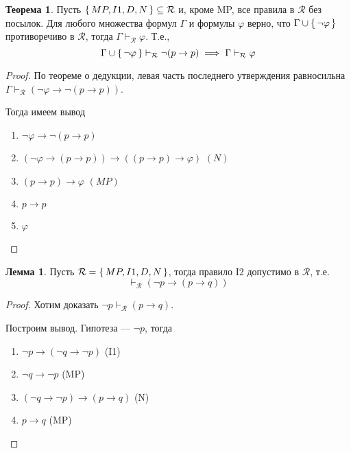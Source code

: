 \documentclass[12pt]{article}
\let\im\rightarrow
\let\n\neg
\let\un\cup
\let\sus\subseteq
\theoremstyle{definition}
\newtheorem{theorem}{Теорема}[section]
\theoremstyle{statement}
\theoremstyle{theorem}
\newtheorem{lemma}{Лемма}[section]
\begin{document}
\begin{theorem}
  Пусть $\set{MP, I1, D, N} \sus \mathcal{R}$ и, кроме MP, все
  правила в $\mathcal{R}$ без посылок. Для любого множества формул
  $\Gamma$ и формулы $\varphi$ верно, что $\Gamma \un \set{\n
  \varphi}$ противоречиво в $\mathcal{R}$, тогда $\Gamma
  \vdash_{\mathcal{R}} \varphi$. Т.е.,
  \begin{displaymath}
    \Gamma \un \set{\n \varphi} \vdash_{\mathcal{R}} \n (p \im p)
    \implies \Gamma \vdash_{\mathcal{R}} \varphi
  \end{displaymath}
  \begin{proof}
    По теореме о дедукции, левая часть последнего утверждения
    равносильна $\Gamma \vdash_{\mathcal{R}} (\n \varphi \im \n (p \im p))$.

    Тогда имеем вывод
    \begin{enumerate}
      \item $\n \varphi \im \n (p \im p)$

      \item $(\n \varphi \im (p \im p)) \im ((p \im p) \im \varphi)$ $(N)$

      \item $(p \im p) \im \varphi$ $(MP)$

      \item $p \im p$

      \item $\varphi$
    \end{enumerate}
  \end{proof}
\end{theorem}

\begin{lemma}
  Пусть $\mathcal{R} = \set{MP, I1, D, N}$, тогда правило I2
  допустимо в $\mathcal{R}$, т.е.
  \begin{displaymath}
    \vdash_{\mathcal{R}} (\n p \im (p \im q))
  \end{displaymath}
  \begin{proof}
    Хотим доказать $\n p \vdash_{\mathcal{R}} (p \im q)$.

    Построим вывод. Гипотеза --- $\n p$, тогда
    \begin{enumerate}
      \item $\n p \im (\n q \im \n p)$ (I1)

      \item $\n q \im \n p$ (MP)

      \item $(\n q \im \n p) \im (p \im q)$ (N)

      \item $p \im q$ (MP)
    \end{enumerate}
  \end{proof}
\end{lemma}
\end{document}
